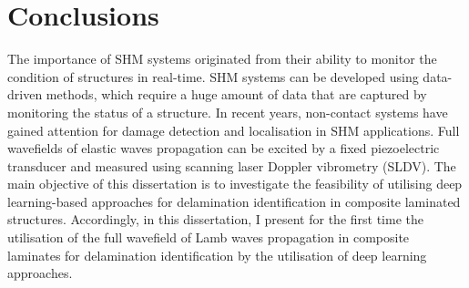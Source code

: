 \section{Conclusions}
\label{sec61}

The importance of SHM systems originated from their ability to monitor the condition of structures in real-time.
SHM systems can be developed using data-driven methods, which require a huge amount of data that are captured by monitoring the status of a structure.
In recent years, non-contact systems have gained attention for damage detection and localisation in SHM applications.
Full wavefields of elastic waves propagation can be excited by a fixed piezoelectric transducer and measured using scanning laser Doppler vibrometry (SLDV).
The main objective of this dissertation is to investigate the feasibility of utilising deep learning-based approaches for delamination identification in composite laminated structures.
Accordingly, in this dissertation, I present for the first time the utilisation of the full wavefield of Lamb waves propagation in composite laminates for delamination identification by the utilisation of deep learning approaches. 

